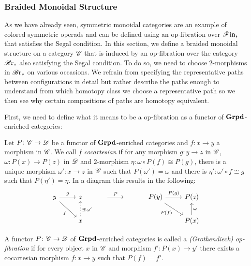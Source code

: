 \subsubsection{Braided Monoidal Structure}

As we have already seen, symmetric monoidal categories are an example of colored
symmetric operads and can be defined using an op-fibration over $\mathscr{F} \text{in}_{\ast}$ that
satisfies the Segal condition. In this section, we define a braided
monoidal structure on a category $\mathscr{C}$ that is induced by an op-fibration over
the category $\mathscr{B} \text{r}_{\ast}$ also satisfying the Segal condition. To do so, we need
to choose 2-morphisms in $\mathscr{B} \text{r}_{\ast}$ on various occasions. We refrain from
specifying the representative paths between configurations in detail but rather describe the
paths enough to understand from which homotopy class we choose a representative
path so we then see why certain compositions of paths are homotopy equivalent. 



First, we need to define what it means to be
a op-fibration as a functor of $\operatorname{\textbf{Grpd}}$-enriched categories:

\begin{defin}
    Let $P \colon \mathscr{C} \to \mathscr{D} $ be a functor of $\operatorname{\textbf{Grpd}}$-enriched categories and $f
    \colon x \to y$ a morphism in $\mathscr{C}$. We call $f$ {\em cocartesian} if for
    any morphism $g \colon  y \to z$ in $\mathscr{C}$,
    $\omega \colon P(x) \to P(z)$ in $\mathscr{D}$ and $2$-morphism $\eta \colon \omega \circ P(f) \cong P(g)$,
    there is a unique morphism $\omega' \colon x \to z$ in $\mathscr{C}$ such that
    $P(\omega')=\omega$ and there is $\eta' \colon \omega' \circ f \cong g$ such that $P(\eta')=\eta$. In a diagram this results
    in the following:
    \[
        \begin{tikzcd}
            y \arrow[r, "g"] \arrow[rd, "f"'] & z                                & {} \arrow[r, "P"] & {} & P(y) \arrow[r, "P(g)"] \arrow[rd, "P(f)"'] & P(z)           \\
                                            & x \arrow[u, "\exists! \omega'"', dotted] &                   &    &                           & P(x) \arrow[u, "\omega"']
        \end{tikzcd}
    \]
\end{defin}

\begin{defin}
    A functor $P \colon \mathscr{C} \to \mathscr{D}$ of $\operatorname{\textbf{Grpd}}$-enriched categories is called 
    a {\em (Grothendieck) op-fibration} if for every object $x$ in $\mathscr{C}$ and morphism
    $f' \colon P(x) \to y'$ there exists a cocartesian morphism $f \colon x
    \to y$ such that $P(f)=f'$.
\end{defin}

